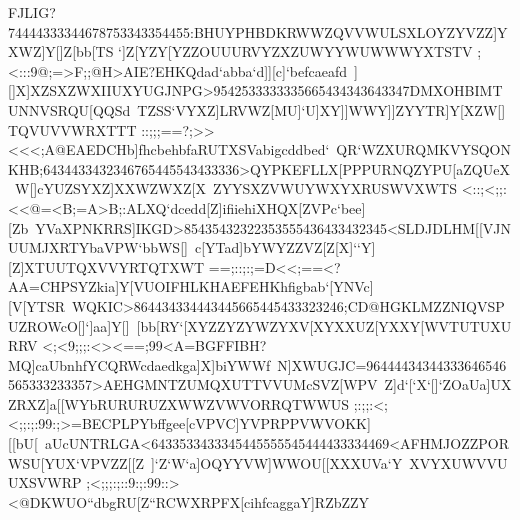 {{{ FJLIG?74444333344678753343354455:BHUYPHBDKRWWZQVVWULSXLOYZYVZZ]YXWZ]Y[]Z[bb[TS%
 `]Z[YZY[YZZOUUURVYZXZUWYYWUWWWYXTSTV}
 \hbox{;<:::9@;=>F;;@H>AIE?EHKQdad`abba`d]][c]`befcaeafd%
 ][]X]XZSXZWXIIUXYUGJNPG>9542533333335665434343643347DMXOHBIMTUNNVSRQU[QQSd%
 TZSS`VYXZ]LRVWZ[MU]`U]XY]]WWY]]ZYYTR]Y[XZW[]TQVUVVWRXTTT}
 \hbox{::;;;==?;>><<<;A@EAEDCHb]fhcbehbfaRUTXSVabigcddbed`%
 QR`WZXURQMKVYSQONKHB;6434433432346765445543433336>QYPKEFLLX[PPPURNQZYPU[aZQUeX%
 W[]cYUZSYXZ]XXWZWXZ[X%
 ZYYSXZVWUYWXYXRUSWVXWTS}
 \hbox{<::;<;;:<<@=<B;=A>B;:ALXQ`dcedd[Z]ifiiehiXHQX[ZVPc`bee][Zb%
 YVaXPNKRRS]IKGD>85435432322353555436433432345<SLDJDLHM[[VJNUUMJXRTYbaVPW`bbWS[]%
 c[YTad]bYWYZZVZ[Z[X]``Y][Z]XTUUTQXVVYRTQTXWT}
 \hbox{==;::;:;=D<<;==<?AA=CHPSYZkia]Y[VUOIFHLKHAEFEHKhfigbab`[YNVc][V[YTSR%
 WQKIC>864434334443445665445433323246;CD@HGKLMZZNIQVSPUZROWcO[]`]aa]Y[]%
 [bb[RY`[XYZZYZYWZYXV[XYXXUZ[YXXY[WVTUTUXURRV}
 \hbox{<;<9;;;:<><==;99<A=BGFFIBH?MQ]caUbnhfYCQRWcdaedkga]X]biYWWf%
 N]XWUGJC=96444434344333646546565333233357>AEHGMNTZUMQXUTTVVUMcSVZ[WPV%
 Z]d`[`X`[]`ZOaUa]UXZRXZ]a[[WYbRURURUZXWWZVWVORRQTWWUS}
 \hbox{;:;;:<;<;;:;:99:;>=BECPLPYbffgee[cVPVC]YVPRPPVWVOKK][[bU[%
 aUcUNTRLGA<6433533433345445555545444433334469<AFHMJOZZPORWSU[YUX`VPVZZ[[Z%
 ]`Z`W`a]OQYYVW]WWOU[[XXXUVa`Y%
 XVYXUWVVUUXSVWRP}
 \hbox{;<;;;:;::9:;:99::><@DKWUO``dbgRU[Z``RCWXRPFX[cihfcaggaY]RZbZZY%
}}}
